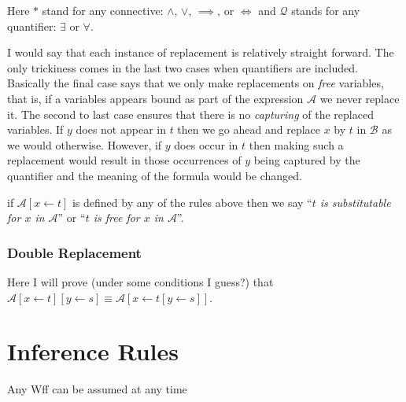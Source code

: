 \documentclass[12pt]{article}
\newcommand{\mc}[1]{\mathcal{#1}}
\begin{document}
Here $\ast$ stand for any connective: $\land$, $\lor$, $\implies$, or $\iff$ and $\mathcal{Q}$ stands for any quantifier: $\exists$ or $\forall$.

I would say that each instance of replacement is relatively straight forward. The only trickiness comes in the last two cases when quantifiers are included. Basically the final case says that we only make replacements on \textit{free} variables, that is, if a variables appears bound as part of the expression $\mc{A}$ we never replace it.
The second to last case ensures that there is no \textit{capturing} of the replaced variables. If $y$ does not appear in $t$ then we go ahead and replace $x$ by $t$ in $\mc{B}$ as we would otherwise. However, if $y$ does occur in $t$ then making such a replacement would result in those occurrences of $y$ being captured by the quantifier and the meaning of the formula would be changed.

if $\mc{A}[x\leftarrow t]$ is defined by any of the rules above then we say ``\textit{$t$ is substitutable for $x$ in $\mc{A}$}'' or ``\textit{$t$ is free for $x$ in $\mc{A}$}''.

\subsubsection*{Double Replacement}

Here I will prove (under some conditions I guess?) that $\mc{A}[x\leftarrow t][y\leftarrow s] \equiv \mc{A}[x\leftarrow t[y\leftarrow s]]$.


\newpage

\section{Inference Rules}

\hrulefill
\begin{ND}[Rule of $A$][][][][.6\linewidth]
\ndljg{j}{(j)}{$\mc{A}$}{$A$}
\end{ND}
Any Wff can be assumed at any time
\end{document}
